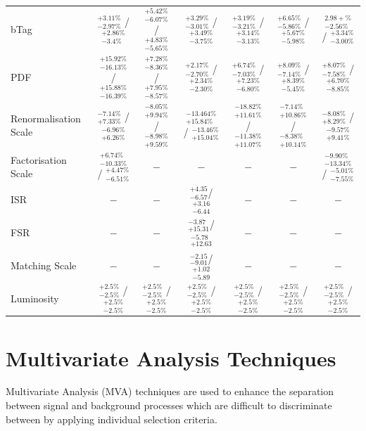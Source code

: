 \begin{table}
\begin{center}
{\begin{tabular}{lcccccc}
bTag             &  $_{-2.97\%}^{+3.11\%}$ /  $_{-3.4\%}^{+2.86\%}$   & $_{-6.07\%}^{+5.42\%}$ / $_{-5.65\%}^{+4.83\%}$  & $_{-3.01\%}^{+3.29\%}$ / $_{-3.75\%}^{+3.49\%}$  & $_{-3.21\%}^{+3.19\%}$ / $_{-3.13\%}^{+3.14\%}$  & $_{-5.86\%}^{+6.65\%}$ / $_{-5.98\%}^{+5.67\%}$ & $_{-2.56\%}^{2.98+\%}$ / $_{-3.00\%}^{+3.34\%}$\\
PDF             &  $_{-16.13\%}^{+15.92\%}$ /  $_{-16.39\%}^{+15.88\%}$   & $_{-8.36\%}^{+7.28\%}$ / $_{-8.57\%}^{+7.95\%}$  & $_{-2.70\%}^{+2.17\%}$ / $_{-2.30\%}^{+2.34\%}$  & $_{-7.03\%}^{+6.74\%}$ / $_{-6.80\%}^{+7.23\%}$  & $_{-7.14\%}^{+8.09\%}$ / $_{-5.45\%}^{+8.39\%}$ & $_{-7.58\%}^{+8.07\%}$ / $_{-8.85\%}^{+6.70\%}$\\
Renormalisation Scale             &  $_{+7.33\%}^{-7.14\%}$ /  $_{+6.26\%}^{-6.96\%}$   & $_{+9.94\%}^{-8.05\%}$ / $_{+9.59\%}^{-8.98\%}$  & $_{+15.84\%}^{-13.464\%}$ / $_{+15.04\%}^{-13.46\%}$  & $_{+11.61\%}^{-18.82\%}$ / $_{+11.07\%}^{-11.38\%}$  & $_{+10.86\%}^{-7.14\%}$ / $_{+10.14\%}^{-8.38\%}$ & $_{+8.29\%}^{-8.08\%}$ / $_{+9.41\%}^{-9.57\%}$\\
Factorisation Scale             &  $_{-10.33\%}^{+6.74\%}$ /  $_{-6.51\%}^{+4.47\%}$  & $-$  & $-$  & $-$  & $-$ & $_{-13.34\%}^{-9.90\%}$ / $_{-7.55\%}^{-5.01\%}$  \\
ISR             &  $-$   & $-$  & $^{+4.35}_{-6.57}$/$_{-6.44}^{+3.16}$ & $-$  & $-$ & $-$  \\
FSR             &  $-$   & $-$  & $_{+15.31}^{-3.87}$/$^{-5.78}_{+12.63}$ & $-$  & $-$ & $-$  \\ 
Matching Scale             &  $-$   & $-$  & $^{-2.15}_{-9.01}$/$_{-5.89}^{+1.02}$ & $-$  & $-$ & $-$ \\
Luminosity             &  $_{-2.5\%}^{+2.5\%}$ /  $_{-2.5\%}^{+2.5\%}$    & $_{-2.5\%}^{+2.5\%}$  / $_{-2.5\%}^{+2.5\%}$   & $_{-2.5\%}^{+2.5\%}$  / $_{-2.5\%}^{+2.5\%}$   & $_{-2.5\%}^{+2.5\%}$  / $_{-2.5\%}^{+2.5\%}$  & $_{-2.5\%}^{+2.5\%}$  / $_{-2.5\%}^{+2.5\%}$ & $_{-2.5\%}^{+2.5\%}$  / $_{-2.5\%}^{+2.5\%}$ \\    
\hline
\end{tabular}
}
\end{center}
\end{table}

\section{Multivariate Analysis Techniques}\label{sec:mvas}
Multivariate Analysis (MVA) techniques are used to enhance the separation between signal and background processes which are difficult to discriminate between by applying individual selection criteria.

